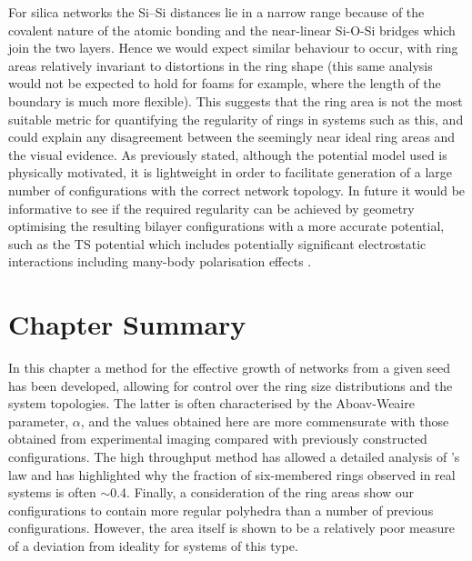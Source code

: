 For silica networks the Si\---Si distances lie in a narrow range because of the covalent nature of the atomic bonding and the near-linear Si-O-Si bridges
which join the two layers. 
Hence we would expect similar behaviour to occur, with ring areas relatively invariant to distortions in the ring shape (this same analysis would not be expected to hold for foams for example, where the length of the boundary is much more flexible). 
This suggests that the ring area is not the most suitable metric for quantifying the regularity of rings in systems such as this, and could explain any disagreement between the seemingly near ideal ring areas and the visual evidence. 
As previously stated, although the potential model used is physically motivated, it is lightweight in order to facilitate generation of a large number of configurations with the correct network topology. 
In future it would be informative to see if the required regularity can be achieved by geometry optimising the resulting bilayer configurations with a more accurate potential, such as the TS potential which includes potentially significant electrostatic interactions including many-body polarisation effects \cite{Tangney2002}.

\section{Chapter Summary}

In this chapter a method for the effective growth of \td{} networks from a given seed has been developed, allowing for control over the ring size distributions and the system topologies. 
The latter is often characterised by the Aboav-Weaire parameter, $\alpha$, and
the values obtained here are more commensurate with those obtained
from experimental imaging compared with previously constructed configurations.
The high throughput method has allowed a detailed analysis of \lm's
law and has highlighted why the fraction of six-membered rings observed
in real systems is often $\sim$0.4. 
Finally, a consideration of the ring areas show our configurations to contain more regular polyhedra than a number of previous configurations. 
However, the area itself is shown to be a relatively poor measure of a deviation from ideality for systems of this type.



